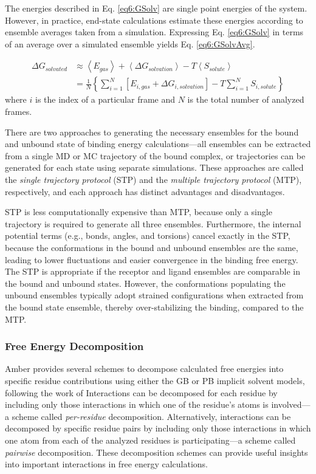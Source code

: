 The energies described in Eq. \ref{eq6:GSolv} are single point energies of the
system. However, in practice, end-state calculations estimate these energies
according to ensemble averages taken from a simulation. Expressing Eq.
\ref{eq6:GSolv} in terms of an average over a simulated ensemble yields Eq.
\ref{eq6:GSolvAvg}.

\begin{align}
   \Delta G_{solvated} & \approx \left \langle E_{gas} \right \rangle + \left
         \langle \Delta G_{solvation} \right \rangle - T \left \langle
         S_{solute} \right \rangle \nonumber \\
   & = \frac 1 N \left \lbrace \sum_{i=1}^N \left[E_{i,gas} + \Delta
         G_{i,solvation} \right] - T\sum_{i=1}^N S_{i,solute} \right \rbrace
   \label{eq6:GSolvAvg}
\end{align}
where $i$ is the index of a particular frame and $N$ is the total number of
analyzed frames.

There are two approaches to generating the necessary ensembles for the bound and
unbound state of binding energy calculations---all ensembles can be extracted
from a single MD or MC trajectory of the bound complex, or trajectories can be
generated for each state using separate simulations. \cite{Wang2006} These
approaches are called the \emph{single trajectory protocol} (STP) and the
\emph{multiple trajectory protocol} (MTP), respectively, and each approach has
distinct advantages and disadvantages.

STP is less computationally expensive than MTP, because only a single trajectory
is required to generate all three ensembles. Furthermore, the internal potential
terms (e.g., bonds, angles, and torsions) cancel exactly in the STP, because
the conformations in the bound and unbound ensembles are the same, leading to
lower fluctuations and easier convergence in the binding free energy. The STP is
appropriate if the receptor and ligand ensembles are comparable in the bound and
unbound states. However, the conformations populating the unbound ensembles
typically adopt strained configurations when extracted from the bound state
ensemble, thereby over-stabilizing the binding, compared to the MTP.

\subsubsection{Free Energy Decomposition}

Amber \cite{AMBER12} provides several schemes to decompose calculated free
energies into specific residue contributions using either the GB or PB implicit
solvent models, \cite{Metz2012} following the work of \citeauthor{Gohlke2003}
\cite{Gohlke2003} Interactions can be decomposed for each residue by including
only those interactions in which one of the residue's atoms is involved---a
scheme called \emph{per-residue} decomposition. Alternatively, interactions can
be decomposed by specific residue pairs by including only those interactions in
which one atom from each of the analyzed residues is participating---a scheme
called \emph{pairwise} decomposition. These decomposition schemes can provide
useful insights into important interactions in free energy calculations.
\cite{Gohlke2003}

